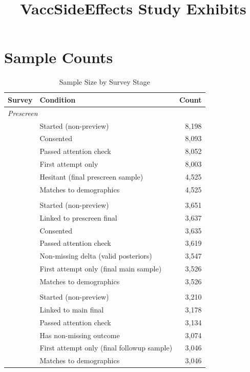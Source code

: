 \documentclass[11pt]{article}
\title{VaccSideEffects Study Exhibits}
\author{}
\date{}
\begin{document}
\maketitle
\tableofcontents
\newpage

\section{Sample Counts}

\begin{table}[H]
\caption{Sample Size by Survey Stage}
\label{tab:counts}
\centering
\begin{tabular}{llr}
\toprule
Survey & Condition & Count \\
\midrule
\multicolumn{3}{l}{\textit{Prescreen}} \\
& Started (non-preview) & 8,198 \\
& Consented & 8,093 \\
& Passed attention check & 8,052 \\
& First attempt only & 8,003 \\
& Hesitant (final prescreen sample) & 4,525 \\
& Matches to demographics & 4,525 \\
\addlinespace
\multicolumn{3}{l}{\textit{Main}} \\
& Started (non-preview) & 3,651 \\
& Linked to prescreen final & 3,637 \\
& Consented & 3,635 \\
& Passed attention check & 3,619 \\
& Non-missing delta (valid posteriors) & 3,547 \\
& First attempt only (final main sample) & 3,526 \\
& Matches to demographics & 3,526 \\
\addlinespace
\multicolumn{3}{l}{\textit{Followup}} \\
& Started (non-preview) & 3,210 \\
& Linked to main final & 3,178 \\
& Passed attention check & 3,134 \\
& Has non-missing outcome & 3,074 \\
& First attempt only (final followup sample) & 3,046 \\
& Matches to demographics & 3,046 \\
\bottomrule
\end{tabular}
\end{table}
\end{document}
